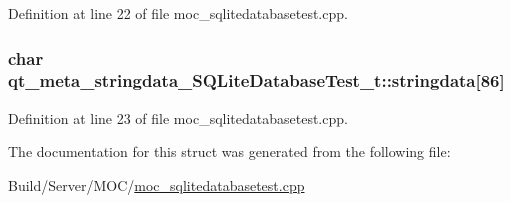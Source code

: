 Definition at line 22 of file moc\+\_\+sqlitedatabasetest.\+cpp.

\hypertarget{structqt__meta__stringdata___s_q_lite_database_test__t_a3df12543448040dd161129950d12908e}{}
\subsubsection[{stringdata}]{\setlength{\rightskip}{0pt plus 5cm}char qt\+\_\+meta\+\_\+stringdata\+\_\+\+S\+Q\+Lite\+Database\+Test\+\_\+t\+::stringdata\mbox{[}86\mbox{]}}\label{structqt__meta__stringdata___s_q_lite_database_test__t_a3df12543448040dd161129950d12908e}


Definition at line 23 of file moc\+\_\+sqlitedatabasetest.\+cpp.



The documentation for this struct was generated from the following file\+:\begin{DoxyCompactItemize}
\item 
Build/\+Server/\+M\+O\+C/\hyperlink{moc__sqlitedatabasetest_8cpp}{moc\+\_\+sqlitedatabasetest.\+cpp}\end{DoxyCompactItemize}
